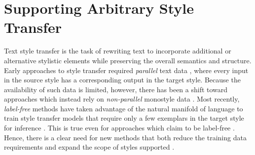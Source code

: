 \section{Supporting Arbitrary Style Transfer}
\label{section:style_transfer}

Text style transfer is the task of rewriting text to incorporate additional or alternative stylistic elements while preserving the overall semantics and structure.
Early approaches to style transfer required \textit{parallel} text data \citep{zhu-etal-2010-monolingual,rao-tetreault-2018-dear}, where every input in the source style has a corresponding output in the target style.
Because the availability of such data is limited, however, there has been a shift toward approaches which instead rely on \textit{non-parallel} monostyle data \cite{li-etal-2018-delete,jin-etal-2019-imat, liu2020revision,style-transfer-as-paraphrase-2020}.
Most recently, \textit{label-free} methods have taken advantage of the natural manifold of language to train style transfer models that require only a few exemplars in the target style for inference \citep{DBLP:journals/corr/abs-1905-11975, DBLP:journals/corr/abs-2010-03802}.
This is true even for approaches which claim to be label-free \citep{DBLP:journals/corr/abs-1905-11975,DBLP:journals/corr/abs-2010-03802}.
Hence, there is a clear need for new methods that both reduce the training data requirements and expand the scope of styles supported \citep{DBLP:journals/corr/abs-2011-00416,DBLP:journals/corr/abs-2010-12742}.

